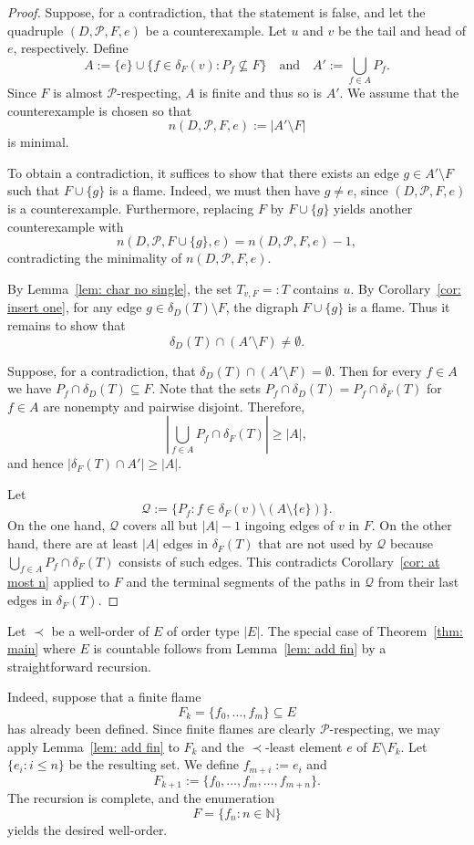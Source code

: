 \documentclass[12pt,a4paper]{amsart}
\theoremstyle{plain}
\theoremstyle{definition}
\begin{document}
\begin{proof}
Suppose, for a contradiction, that the statement is false, and let the quadruple
$(D,\mathcal{P},F,e)$ be a counterexample. Let $u$ and $v$ be the tail and head of $e$,
respectively. Define
\[
A:=\{e\}\cup\{f\in \delta_F(v) : P_f\not\subseteq F\}
\quad\text{and}\quad
A':=\bigcup_{f\in A} P_f .
\]
Since $F$ is almost $\mathcal{P}$-respecting,  $A$ is finite and thus so is  $A'$. We assume
that the counterexample is chosen so that
\[
n(D,\mathcal{P},F,e):=\lvert A'\setminus F\rvert
\]
is minimal.

To obtain a contradiction, it suffices to show that there exists an edge
$g\in A'\setminus F$ such that $F\cup\{g\}$ is a flame. Indeed, we must then have
$g\neq e$, since $(D,\mathcal{P},F,e)$ is a counterexample. Furthermore, replacing $F$ by
$F\cup\{g\}$ yields another counterexample with
\[
n(D,\mathcal{P},F\cup\{g\},e)=n(D,\mathcal{P},F,e)-1,
\]
contradicting the minimality of $n(D,\mathcal{P},F,e)$.

By Lemma~\ref{lem: char no single}, the set $T_{v,F}=:T$ contains $u$. By
Corollary~\ref{cor: insert one}, for any edge $g\in \delta_D(T)\setminus F$, the digraph
$F\cup\{g\}$ is a flame. Thus it remains to show that
\[
\delta_D(T)\cap(A'\setminus F)\neq\emptyset.
\]

Suppose, for a contradiction, that $\delta_D(T)\cap(A'\setminus F)=\emptyset$. Then for
every $f\in A$ we have $P_f\cap \delta_D(T)\subseteq F$. Note that the sets $P_f\cap \delta_D(T)=P_f\cap \delta_F(T)$ for $f\in A$
are nonempty and pairwise disjoint. Therefore,
\[
\left|\bigcup_{f\in A} P_f\cap \delta_F(T)\right|\geq |A|,
\]
and hence $|\delta_F(T)\cap A'|\geq |A|$.

Let
\[
\mathcal{Q}:=\{P_f : f\in \delta_F(v)\setminus(A\setminus\{e\})\}.
\]
On the one hand, $\mathcal{Q}$ covers all but $|A|-1$ ingoing edges of $v$ in $F$. On the
other hand, there are at least $|A|$ edges in
$\delta_F(T)$ that are not used by $\mathcal{Q}$ because $\bigcup_{f\in A} P_f\cap \delta_F(T)$ consists of such edges. This contradicts
Corollary~\ref{cor: at most n} applied to $F$  and the terminal segments of the paths in $\mathcal{Q}$ from their last edges in $\delta_{F}(T)$.
\end{proof}

Let $\prec$ be a well-order of $E$ of order type $|E|$. The special case of
Theorem~\ref{thm: main} where $E$ is countable follows from
Lemma~\ref{lem: add fin} by a straightforward recursion.

Indeed, suppose that a finite flame
\[
F_k=\{f_0,\dots,f_m\}\subseteq E
\]
has already been defined. Since finite flames are clearly $\mathcal{P}$-respecting, we
may apply Lemma~\ref{lem: add fin} to $F_k$ and the $\prec$-least element $e$ of
$E\setminus F_k$. Let $\{e_i : i\leq n\}$ be the resulting set. We define
$f_{m+i}:=e_i$ and
\[
F_{k+1}:=\{f_0,\dots,f_m,\dots,f_{m+n}\}.
\]
The recursion is complete, and the enumeration
\[
F=\{f_n : n\in\mathbb{N}\}
\]
yields the desired well-order.
\end{document}
